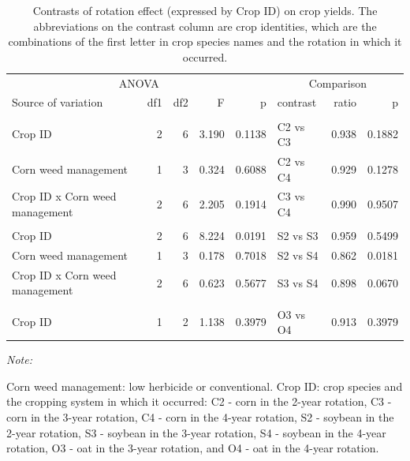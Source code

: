 \documentclass[
]{article}
\begin{document}
\begin{table}

\caption{\label{tab:crop-jt-ct}Contrasts of rotation effect (expressed by Crop ID) on crop yields. The abbreviations on the contrast column are crop identities, which are the combinations of the first letter in crop species names and the rotation in which it occurred.}
\centering
\begin{threeparttable}
\begin{tabular}[t]{lrrr>{}r|lrr}
\toprule
\multicolumn{5}{c}{ANOVA} & \multicolumn{3}{c}{Comparison} \\
\cmidrule(l{3pt}r{3pt}){1-5} \cmidrule(l{3pt}r{3pt}){6-8}
Source of variation & df1 & df2 & F & p & contrast & ratio & p\\
\midrule
\addlinespace[0.3em]
\multicolumn{8}{l}{\textbf{(A) - Corn}}\\
\hspace{1em}Crop ID & 2 & 6 & 3.190 & 0.1138 & C2 vs C3 & 0.938 & 0.1882\\
\hspace{1em}Corn weed management & 1 & 3 & 0.324 & 0.6088 & C2 vs C4 & 0.929 & 0.1278\\
\hspace{1em}Crop ID x Corn weed management & 2 & 6 & 2.205 & 0.1914 & C3 vs C4 & 0.990 & 0.9507\\
\addlinespace[0.3em]
\multicolumn{8}{l}{\textbf{(B) - Soybean}}\\
\hspace{1em}Crop ID & 2 & 6 & 8.224 & 0.0191 & S2 vs S3 & 0.959 & 0.5499\\
\hspace{1em}Corn weed management & 1 & 3 & 0.178 & 0.7018 & S2 vs S4 & 0.862 & 0.0181\\
\hspace{1em}Crop ID x Corn weed management & 2 & 6 & 0.623 & 0.5677 & S3 vs S4 & 0.898 & 0.0670\\
\addlinespace[0.3em]
\multicolumn{8}{l}{\textbf{(C) - Oat}}\\
\hspace{1em}Crop ID & 1 & 2 & 1.138 & 0.3979 & O3 vs O4 & 0.913 & 0.3979\\
\bottomrule
\end{tabular}
\begin{tablenotes}[para]
\item \textit{Note: } 
\item Corn weed management: low herbicide or conventional. Crop ID: crop species and the cropping system in which it occurred: C2 - corn in the 2-year rotation, C3 - corn in the 3-year rotation, C4 - corn in the 4-year rotation, S2 - soybean in the 2-year rotation, S3 - soybean in the 3-year rotation, S4 - soybean in the 4-year rotation, O3 - oat in the 3-year rotation, and O4 - oat in the 4-year rotation.
\end{tablenotes}
\end{threeparttable}
\end{table}
\end{document}
